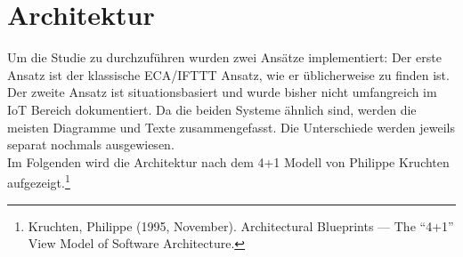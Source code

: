 \section{Architektur}
Um die Studie zu durchzuführen wurden zwei Ansätze implementiert: Der erste Ansatz ist der klassische ECA/IFTTT Ansatz, wie er üblicherweise zu finden ist. Der zweite Ansatz ist situationsbasiert und wurde bisher nicht umfangreich im IoT Bereich dokumentiert. Da die beiden Systeme ähnlich sind, werden die meisten Diagramme und Texte zusammengefasst. Die Unterschiede werden jeweils separat nochmals ausgewiesen.\\
%
Im Folgenden wird die Architektur nach dem 4+1 Modell von Philippe Kruchten aufgezeigt.\footnote{Kruchten, Philippe (1995, November). Architectural Blueprints — The “4+1” View Model of Software Architecture.}
%
